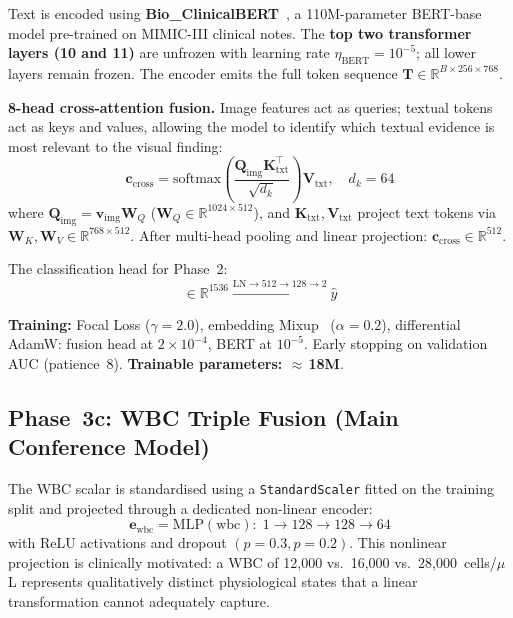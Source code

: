 \documentclass[conference]{IEEEtran}
\begin{document}
Text is encoded using \textbf{Bio\_ClinicalBERT}~\cite{alsentzer2019bert}, a 110M-parameter BERT-base model pre-trained on MIMIC-III clinical notes. The \textbf{top two transformer layers (10 and 11)} are unfrozen with learning rate $\eta_{\text{BERT}}\!=\!10^{-5}$; all lower layers remain frozen. The encoder emits the full token sequence $\mathbf{T} \in \mathbb{R}^{B \times 256 \times 768}$.

\textbf{8-head cross-attention fusion.} Image features act as queries; textual tokens act as keys and values, allowing the model to identify which textual evidence is most relevant to the visual finding:
\begin{equation}
  \mathbf{c}_{\text{cross}} = \text{softmax}\!\left(\frac{\mathbf{Q}_{\text{img}}\mathbf{K}_{\text{txt}}^\top}{\sqrt{d_k}}\right)\mathbf{V}_{\text{txt}}, \quad d_k = 64
  \label{eq:crossattn}
\end{equation}
where $\mathbf{Q}_{\text{img}} = \mathbf{v}_{\text{img}}\mathbf{W}_Q$ ($\mathbf{W}_Q \in \mathbb{R}^{1024 \times 512}$), and $\mathbf{K}_{\text{txt}}, \mathbf{V}_{\text{txt}}$ project text tokens via $\mathbf{W}_K, \mathbf{W}_V \in \mathbb{R}^{768 \times 512}$. After multi-head pooling and linear projection: $\mathbf{c}_{\text{cross}} \in \mathbb{R}^{512}$.

The classification head for Phase~2:
\begin{equation}
  [\mathbf{v}_{\text{img}} \,\|\, \mathbf{c}_{\text{cross}}] \in \mathbb{R}^{1536} \xrightarrow{\text{LN} \to 512 \to 128 \to 2} \hat{y}
\end{equation}

\textbf{Training:} Focal Loss ($\gamma\!=\!2.0$), embedding Mixup~\cite{zhang2018mixup} ($\alpha\!=\!0.2$), differential AdamW: fusion head at $2\!\times\!10^{-4}$, BERT at $10^{-5}$. Early stopping on validation AUC (patience~8). \textbf{Trainable parameters: $\approx$\,18M}.

\subsection{Phase~3c: WBC Triple Fusion (Main Conference Model)}

The WBC scalar is standardised using a \texttt{StandardScaler} fitted on the training split and projected through a dedicated non-linear encoder:
\begin{equation}
  \mathbf{e}_{\text{wbc}} = \text{MLP}(\text{wbc}): \; 1 \to 128 \to 128 \to 64
  \label{eq:wbcmlp}
\end{equation}
with ReLU activations and dropout $(p\!=\!0.3, p\!=\!0.2)$. This nonlinear projection is clinically motivated: a WBC of 12{,}000 vs.\ 16{,}000 vs.\ 28{,}000~cells/$\mu$L represents qualitatively distinct physiological states that a linear transformation cannot adequately capture.
\end{document}
